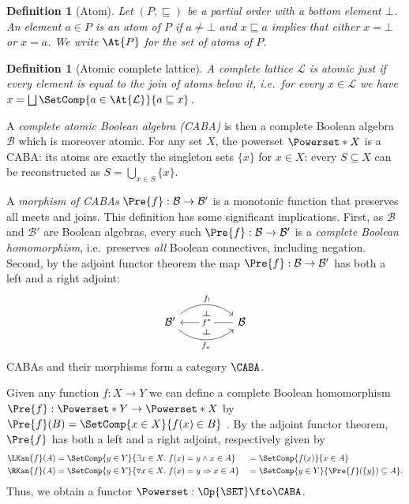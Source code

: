 \documentclass[10pt,a4paper]{article}
\newtheorem{definition}[theorem]{Definition}
\begin{document}
\begin{definition}[Atom]
  Let $(P, \sqsubseteq)$ be a partial order with a bottom element $\bot$. An
  element $a \in P$ is an \emph{atom} of $P$ if $a \neq \bot$ and $x \sqsubseteq
  a$ implies that either $x = \bot$ or $x = a$. We write $\At{P}$ for the set of
  atoms of $P$.
\end{definition}

\begin{definition}[Atomic complete lattice]
  A complete lattice $\mathcal{L}$ is \emph{atomic} just if every element is
  equal to the join of atoms below it, i.e.\ for every $x \in \mathcal{L}$ we
  have $x = \bigsqcup \SetComp{ a \in \At{\mathcal{L}}}{ a \sqsubseteq x }$.
\end{definition}

A \emph{complete atomic Boolean algebra (CABA)} is then a complete Boolean
algebra $\mathcal{B}$ which is moreover atomic. For any set $X$, the powerset $\Powerset*{X}$
is a CABA: its atoms are exactly the singleton sets $\{ x \}$ for $x \in X$:
every $S \subseteq X$ can be reconstructed as $S = \bigcup_{x \in S} \{ x \}$.

A \emph{morphism of CABAs} $\Pre{f} : \mathcal{B} \to \mathcal{B}'$ is
a monotonic function that preserves all meets and joins. This
definition has some significant implications. First, as $\mathcal{B}$
and $\mathcal{B}'$ are Boolean algebras, every such
$\Pre{f} : \mathcal{B} \to \mathcal{B}'$ is a \emph{complete Boolean
  homomorphism}, i.e.\ preserves \emph{all} Boolean connectives,
including negation. Second, by the adjoint functor theorem the map
$\Pre{f} : \mathcal{B} \to \mathcal{B}'$ has both a left and a right
adjoint:
\[
  \begin{tikzcd}[column sep=huge]
    \mathcal{B}' \arrow[r, bend left=40, "f_!"] \arrow[r, bend right=40, "f_*"'] & \mathcal{B} \arrow[l, "f^*" description] \arrow[phantom, from=1-1, to=1-2, "{\rotatebox[origin=c]{-90}{$\dashv$}}" pos=0.5, shift left=3.5, description] \arrow[phantom, from=1-1, to=1-2, "{\rotatebox[origin=c]{-90}{$\dashv$}}", pos=0.5, shift right=3.5, description]
  \end{tikzcd}
\]
CABAs and their morphisms form a category $\CABA$.

Given any function $f : X \to Y$ we can define a complete Boolean homomorphism
$\Pre{f} : \Powerset*{Y} \to \Powerset*{X}$ by $\Pre{f}(B) = \SetComp{ x \in X
}{ f(x) \in B}$ \cite{lawvere_1970,mellies_2016,kishida_2018}. By the adjoint
functor theorem, $\Pre{f}$ has both a left and a right adjoint, respectively
given by
\begin{alignat*}{2}
  \LKan{f}(A) &= \SetComp{ y \in Y }{\exists x \in X.\ f(x) = y \land x \in A }
  &&= \SetComp{ f(x) }{ x \in A } \\
  \RKan{f}(A) &= \SetComp{ y \in Y }{ \forall x \in X.\ f(x) = y \Rightarrow x \in A }
  &&= \SetComp { y \in Y }{ \Pre{f}(\{ y \}) \subseteq A }.
\end{alignat*}
Thus, we obtain a functor $\Powerset : \Op{\SET} \fto \CABA$.
\end{document}
